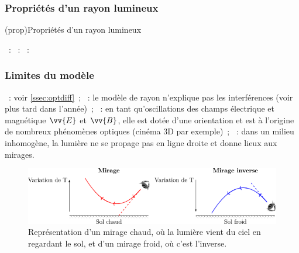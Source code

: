 \documentclass[../../main/main.tex]{subfiles}
\begin{document}
\subsubsection{Propriétés d'un rayon lumineux}

\begin{tcb}[label=prop:rl](prop){Propriétés d'un rayon lumineux}
	\begin{enumerate}
		~: 
		~: 
		~: 
		\begin{center}
			\captionsetup{justification=centering}
		\end{center}
	\end{enumerate}
\end{tcb}

\subsubsection{Limites du modèle}

\begin{itemize}[label=$\diamond$, leftmargin=10pt]
	~: voir \ref{ssec:optdiff}~;
	~: le modèle de rayon n'explique pas les
	interférences (voir plus tard dans l'année)~;
	~: en tant qu'oscillations des champs électrique et
	magnétique $\vv{E}$ et $\vv{B}$, elle est dotée d'une orientation et est à
	l'origine de nombreux phénomènes optiques (cinéma 3D par exemple)~;
	~: dans un milieu inhomogène, la lumière ne se propage
	pas en ligne droite et donne lieux aux mirages.
\end{itemize}
\begin{figure}[htbp]
	\centering
	\includegraphics[width=\linewidth]{mirages}
	\caption{Représentation d'un mirage chaud, où la lumière vient du ciel en
		regardant le sol, et d'un mirage froid, où c'est l'inverse.}
	\label{fig:mirages}
\end{figure}
\end{document}
